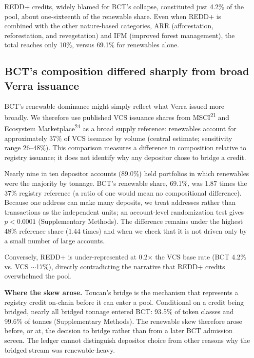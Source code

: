 \documentclass[sn-nature,Numbered]{sn-jnl}
\begin{document}
REDD+ credits, widely blamed for BCT's collapse, constituted just 4.2\% of the pool, about one-sixteenth of the renewable share. Even when REDD+ is combined with the other nature-based categories, ARR (afforestation, reforestation, and revegetation) and IFM (improved forest management), the total reaches only 10\%, versus 69.1\% for renewables alone.


\subsection*{BCT's composition differed sharply from broad Verra issuance}

BCT's renewable dominance might simply reflect what Verra issued more broadly. We therefore use published VCS issuance shares from MSCI\textsuperscript{21} and Ecosystem Marketplace\textsuperscript{24} as a broad supply reference: renewables account for approximately 37\% of VCS issuance by volume (central estimate; sensitivity range 26--48\%). This comparison measures a difference in composition relative to registry issuance; it does not identify why any depositor chose to bridge a credit.

Nearly nine in ten depositor accounts (89.0\%) held portfolios in which renewables were the majority by tonnage. BCT's renewable share, 69.1\%, was 1.87 times the 37\% registry reference (a ratio of one would mean no compositional difference). Because one address can make many deposits, we treat addresses rather than transactions as the independent units; an account-level randomization test gives $p < 0.0001$ (Supplementary Methods). The difference remains under the highest 48\% reference share (1.44 times) and when we check that it is not driven only by a small number of large accounts.

Conversely, REDD+ is under-represented at 0.2$\times$ the VCS base rate (BCT 4.2\% vs. VCS $\sim$17\%), directly contradicting the narrative that REDD+ credits overwhelmed the pool.

\textbf{Where the skew arose.} Toucan's bridge is the mechanism that represents a registry credit on-chain before it can enter a pool. Conditional on a credit being bridged, nearly all bridged tonnage entered BCT: 93.5\% of token classes and 99.6\% of tonnes (Supplementary Methods). The renewable skew therefore arose before, or at, the decision to bridge rather than from a later BCT admission screen. The ledger cannot distinguish depositor choice from other reasons why the bridged stream was renewable-heavy.
\end{document}
